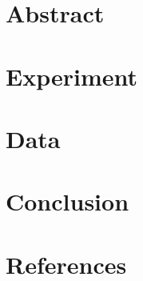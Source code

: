 \section*{Abstract}

\section*{Experiment}

\section*{Data}

\section*{Conclusion}

\section*{References}
